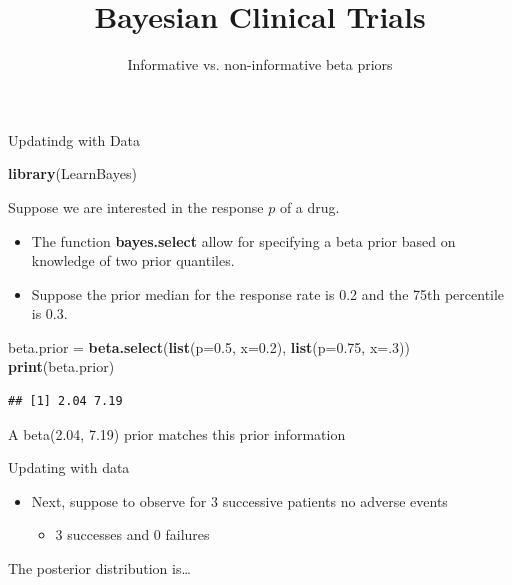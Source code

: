 \documentclass{beamer}
\title[]{Bayesian Clinical Trials}
\subtitle{Informative vs. non-informative beta priors}
\date{}
\newenvironment{Shaded}{}{}
\newcommand{\KeywordTok}[1]{\textcolor[rgb]{0.00,0.44,0.13}{\textbf{{#1}}}}
\newcommand{\DataTypeTok}[1]{\textcolor[rgb]{0.56,0.13,0.00}{{#1}}}
\newcommand{\DecValTok}[1]{\textcolor[rgb]{0.25,0.63,0.44}{{#1}}}
\newcommand{\FloatTok}[1]{\textcolor[rgb]{0.25,0.63,0.44}{{#1}}}
\newcommand{\StringTok}[1]{\textcolor[rgb]{0.25,0.44,0.63}{{#1}}}
\newcommand{\NormalTok}[1]{{#1}}
\begin{document}
\begin{frame}
\titlepage %
\end{frame}


\begin{frame}[fragile]{Updatindg with Data}

\begin{Shaded}
\begin{Highlighting}[]
\KeywordTok{library}\NormalTok{(LearnBayes)}
\end{Highlighting}
\end{Shaded}

Suppose we are interested in the response \(p\) of a drug.

\begin{itemize}
\item
  The function \textbf{bayes.select} allow for specifying a beta prior
  based on knowledge of two prior quantiles.
\item
  Suppose the prior median for the response rate is 0.2 and the 75th
  percentile is 0.3.
\end{itemize}

\begin{Shaded}
\begin{Highlighting}[]
\NormalTok{beta.prior =}\StringTok{ }\KeywordTok{beta.select}\NormalTok{(}\KeywordTok{list}\NormalTok{(}\DataTypeTok{p=}\FloatTok{0.5}\NormalTok{, }\DataTypeTok{x=}\FloatTok{0.2}\NormalTok{), }\newline
\KeywordTok{list}\NormalTok{(}\DataTypeTok{p=}\FloatTok{0.75}\NormalTok{, }\DataTypeTok{x=}\NormalTok{.}\DecValTok{3}\NormalTok{))}
\KeywordTok{print}\NormalTok{(beta.prior)}
\end{Highlighting}
\end{Shaded}

\begin{verbatim}
## [1] 2.04 7.19
\end{verbatim}

A beta(2.04, 7.19) prior matches this prior information

\end{frame}

\begin{frame}{Updating with data}

\begin{itemize}
\itemsep1pt\parskip0pt
\item
  Next, suppose to observe for 3 successive patients no adverse events

  \begin{itemize}
  \itemsep1pt\parskip0pt
  \item
    3 successes and 0 failures
  \end{itemize}
\end{itemize}

The posterior distribution is\ldots{}

\end{frame}
\end{document}
